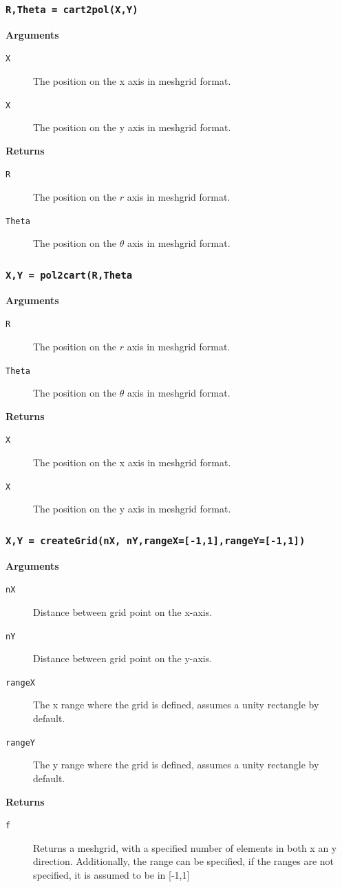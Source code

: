 \documentclass{article}
\begin{document}
\newpage
\subsubsection*{\texttt{R,Theta = cart2pol(X,Y)}}
\textbf{Arguments}
\begin{description}
	\item[\texttt{X}]
	The position on the x axis in meshgrid format.
	\item[\texttt{X}]
	The position on the y axis in meshgrid format.
\end{description}
\textbf{Returns}
\begin{description}
	\item[\texttt{R}]
	The position on the $r$ axis in meshgrid format.
	\item[\texttt{Theta}]
	The position on the $\theta$ axis in meshgrid format.
\end{description}

\newpage
\subsubsection*{\texttt{X,Y = pol2cart(R,Theta}}
\textbf{Arguments}
\begin{description}
	\item[\texttt{R}]
	The position on the $r$ axis in meshgrid format.
	\item[\texttt{Theta}]
	The position on the $\theta$ axis in meshgrid format.
\end{description}
\textbf{Returns}
\begin{description}
	\item[\texttt{X}]
	The position on the x axis in meshgrid format.
	\item[\texttt{X}]
	The position on the y axis in meshgrid format.
\end{description}

\newpage
\subsubsection*{\texttt{X,Y = createGrid(nX, nY,rangeX=[-1,1],rangeY=[-1,1])}}
\textbf{Arguments}
\begin{description}
	\item[\texttt{nX}]
	Distance between grid point on the x-axis.
	\item[\texttt{nY}]
	Distance between grid point on the y-axis.
	\item[\texttt{rangeX}]
	The x range where the grid is defined, assumes a unity rectangle by default.
	\item[\texttt{rangeY}]
	The y range where the grid is defined, assumes a unity rectangle by default.
\end{description}
\textbf{Returns}
\begin{description}
	\item[\texttt{f}]
	Returns a meshgrid, with a specified number of elements in both x an y direction. Additionally, the range can be specified, if the ranges are not specified, it is assumed to be in [-1,1] 
\end{description}
\end{document}
